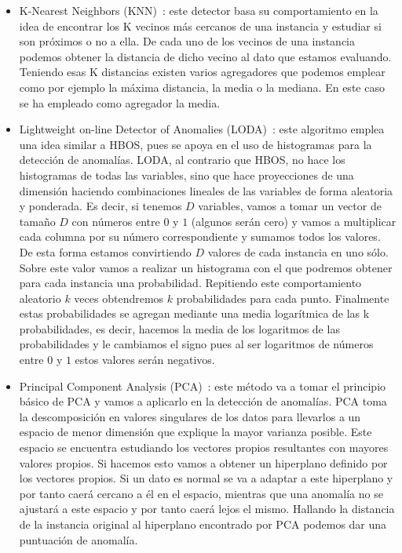 \begin{itemize}
	\item K-Nearest Neighbors (KNN)~\cite{10.1145/335191.335437}: este detector basa su comportamiento en la idea de encontrar los K vecinos más cercanos de una instancia y estudiar si son próximos o no a ella. De cada uno de los vecinos de una instancia podemos obtener la distancia de dicho vecino al dato que estamos evaluando. Teniendo esas K distancias existen varios agregadores que podemos emplear como por ejemplo la máxima distancia, la media o la mediana. En este caso se ha empleado como agregador la media.
	\item Lightweight on-line Detector of Anomalies (LODA)~\cite{10.1007/s10994-015-5521-0}: este algoritmo emplea una idea similar a HBOS, pues se apoya en el uso de histogramas para la detección de anomalías. LODA, al contrario que HBOS, no hace los histogramas de todas las variables, sino que hace proyecciones de una dimensión haciendo combinaciones lineales de las variables de forma aleatoria y ponderada. Es decir, si tenemos $D$ variables, vamos a tomar un vector de tamaño $D$ con números entre $0$ y $1$ (algunos serán cero) y vamos a multiplicar cada columna por su número correspondiente y sumamos todos los valores. De esta forma estamos convirtiendo $D$ valores de cada instancia en uno sólo. Sobre este valor vamos a realizar un histograma con el que podremos obtener para cada instancia una probabilidad. Repitiendo este comportamiento aleatorio $k$ veces obtendremos $k$ probabilidades para cada punto. Finalmente estas probabilidades se agregan mediante una media logarítmica de las k probabilidades, es decir, hacemos la media de los logaritmos de las probabilidades y le cambiamos el signo pues al ser logaritmos de números entre $0$ y $1$ estos valores serán negativos.
	\item Principal Component Analysis (PCA)~\cite{Shyu03anovel}: este método va a tomar el principio básico de PCA y vamos a aplicarlo en la detección de anomalías. PCA toma la descomposición en valores singulares de los datos para llevarlos a un espacio de menor dimensión que explique la mayor varianza posible. Este espacio se encuentra estudiando los vectores propios resultantes con mayores valores propios. Si hacemos esto vamos a obtener un hiperplano definido por los vectores propios. Si un dato es normal se va a adaptar a este hiperplano y por tanto caerá cercano a él en el espacio, mientras que una anomalía no se ajustará a este espacio y por tanto caerá lejos el mismo. Hallando la distancia de la instancia original al hiperplano encontrado por PCA podemos dar una puntuación de anomalía.

\end{itemize}

